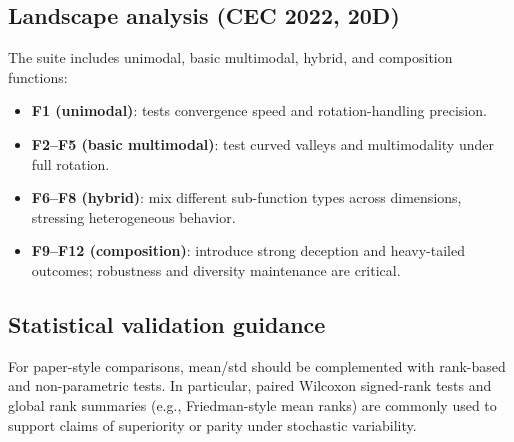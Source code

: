 \documentclass[conference]{IEEEtran}
\begin{document}
\subsection{Landscape analysis (CEC 2022, 20D)}
The suite includes unimodal, basic multimodal, hybrid, and composition functions:
\begin{itemize}
    \item \textbf{F1 (unimodal)}: tests convergence speed and rotation-handling precision.
    \item \textbf{F2--F5 (basic multimodal)}: test curved valleys and multimodality under full rotation.
    \item \textbf{F6--F8 (hybrid)}: mix different sub-function types across dimensions, stressing heterogeneous behavior.
    \item \textbf{F9--F12 (composition)}: introduce strong deception and heavy-tailed outcomes; robustness and diversity maintenance are critical.
\end{itemize}

\subsection{Statistical validation guidance}
For paper-style comparisons, mean/std should be complemented with rank-based and non-parametric tests. In particular, paired Wilcoxon signed-rank tests and global rank summaries (e.g., Friedman-style mean ranks) are commonly used to support claims of superiority or parity under stochastic variability.

\balance
\end{document}
